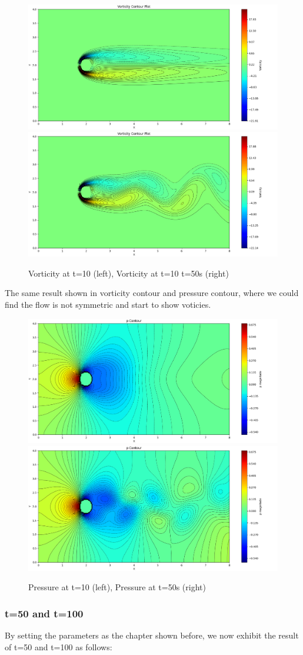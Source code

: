 \documentclass[12pt]{article}
\begin{document}
\begin{figure}[H]
    \centering
    \includegraphics[width=0.45\linewidth]{figure/N32_Re150_8x4_t10/vor_N32_Re150_8x4_t10.jpg}
    \includegraphics[width=0.45\linewidth]{figure/N32_Re150_8x4_t50/vor_N32_Re150_8x4_t50.jpg}
    \caption{Vorticity at t=10 (left), Vorticity at t=10 t=50s (right)}
\end{figure}

The same result shown in vorticity contour and pressure contour, where we could find the flow is not symmetric and start to show voticies.

\begin{figure}[H]
    \centering
    \includegraphics[width=0.45\linewidth]{figure/N32_Re150_8x4_t10/p_N32_Re150_8x4_t10.jpg}
    \includegraphics[width=0.45\linewidth]{figure/N32_Re150_8x4_t50/p_N32_Re150_8x4_t50.jpg}
    \caption{Pressure at t=10 (left), Pressure at t=50s (right)}
\end{figure}






\subsubsection{t=50 and t=100}
By setting the parameters as the chapter shown before, we now exhibit the result of t=50 and t=100 as follows:
\end{document}
